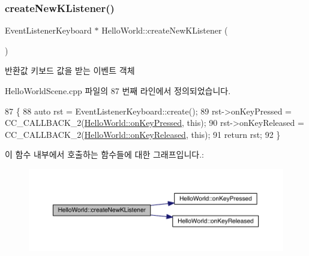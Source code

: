 \mbox{\label{class_hello_world_ab43ad3eb748cab6180daf5a8cfdcf207}} 
\subsubsection{\texorpdfstring{create\+New\+K\+Listener()}{createNewKListener()}}
{\footnotesize\ttfamily Event\+Listener\+Keyboard $\ast$ Hello\+World\+::create\+New\+K\+Listener (\begin{DoxyParamCaption}{ }\end{DoxyParamCaption})\hspace{0.3cm}{\ttfamily [protected]}}

\begin{DoxyReturn}{반환값}
키보드 값을 받는 이벤트 객체 
\end{DoxyReturn}


Hello\+World\+Scene.\+cpp 파일의 87 번째 라인에서 정의되었습니다.


\begin{DoxyCode}
87                                                      \{
88     \textcolor{keyword}{auto} rst = EventListenerKeyboard::create();
89     rst->onKeyPressed = CC\_CALLBACK\_2(\hyperlink{class_hello_world_af2d5a509259a5d0fce7770a38df371d3}{HelloWorld::onKeyPressed}, \textcolor{keyword}{this});
90     rst->onKeyReleased = CC\_CALLBACK\_2(\hyperlink{class_hello_world_acb7b8934f4697e752182a650a1dc7c3a}{HelloWorld::onKeyReleased}, \textcolor{keyword}{this});
91     \textcolor{keywordflow}{return} rst;
92 \}
\end{DoxyCode}
이 함수 내부에서 호출하는 함수들에 대한 그래프입니다.\+:
\nopagebreak
\begin{figure}[H]
\begin{center}
\leavevmode
\includegraphics[width=350pt]{d9/d98/class_hello_world_ab43ad3eb748cab6180daf5a8cfdcf207_cgraph}
\end{center}
\end{figure}
\mbox{\label{class_hello_world_a1b700f5f9de04271533d3fa099d7b014}} 
